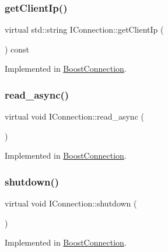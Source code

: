 \subsubsection{\texorpdfstring{get\+Client\+Ip()}{getClientIp()}}
{\footnotesize\ttfamily virtual std\+::string I\+Connection\+::get\+Client\+Ip (\begin{DoxyParamCaption}{ }\end{DoxyParamCaption}) const\hspace{0.3cm}{\ttfamily [pure virtual]}}



Implemented in \mbox{\hyperlink{classBoostConnection_a648ba5a8674fc95b4cab8c94225a19e9}{Boost\+Connection}}.

\mbox{\label{classIConnection_a1c9d492241a79546f243088285279144}} 
\subsubsection{\texorpdfstring{read\+\_\+async()}{read\_async()}}
{\footnotesize\ttfamily virtual void I\+Connection\+::read\+\_\+async (\begin{DoxyParamCaption}{ }\end{DoxyParamCaption})\hspace{0.3cm}{\ttfamily [pure virtual]}}



Implemented in \mbox{\hyperlink{classBoostConnection_a8b117337238e2652adecde8971c1ab93}{Boost\+Connection}}.

\mbox{\label{classIConnection_ae15b6922f3a31a7f316a6390eb2469b2}} 
\subsubsection{\texorpdfstring{shutdown()}{shutdown()}}
{\footnotesize\ttfamily virtual void I\+Connection\+::shutdown (\begin{DoxyParamCaption}{ }\end{DoxyParamCaption})\hspace{0.3cm}{\ttfamily [pure virtual]}}



Implemented in \mbox{\hyperlink{classBoostConnection_a576ca28ef2f8f335ee1a0ccab64cc55b}{Boost\+Connection}}.

